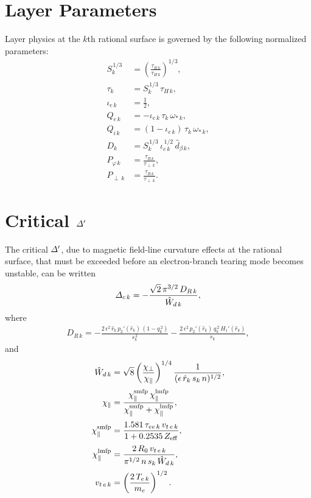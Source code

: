 \documentclass[12pt,prb,aps,notitlepage]{revtex4-1}
\begin{document}
\section{Layer Parameters}
Layer physics at the $k$th rational surface is governed by the following normalized parameters:
\begin{align}
S_k^{\,1/3} &= \left(\frac{\tau_{R\,k}}{\tau_{H\,k}}\right)^{1/3},\\[0.5ex]
\tau_k &= S_k^{\,1/3} \,\tau_{H\,k},\\[0.5ex]
\iota_{e\,k } &= \frac{1}{2},\\[0.5ex]
Q_{e\,k }&= - \iota_{e\,k}\,\tau_k\,\omega_{\ast\,k},\\[0.5ex]
Q_{i\,k }&=  (1-\iota_{e\,k})\,\tau_k\,\omega_{\ast\,k},\\[0.5ex]
D_k &= S_{k}^{\,1/3}\,\iota_{e\,k}^{\,1/2}\,\hat{d}_{\beta\,k},\\[0.5ex]
P_{\varphi\,k} &= \frac{\tau_{R\,k}}{\tau_{\perp\,k}},\\[0.5ex]
P_{\perp\,k} &= \frac{\tau_{R\,k}}{\tau_{\perp\,k}}.
\end{align}

\section{Critical ${\mit\Delta}'$}
The critical ${\mit\Delta}'$, due to magnetic field-line curvature effects at the rational surface, that must be exceeded before an
electron-branch tearing mode becomes unstable, can be written
\begin{align}
{\mit\Delta}_{c\,k} = - \frac{\sqrt{2}\,\pi^{3/2}\,D_{R\,k}}{\hat{W}_{d\,k}},
\end{align}
where
\begin{align}
D_{R\,k} = 
-\frac{2\,\epsilon^2\,\hat{r}_k\,p_2'(\hat{r}_k)\,(1-q_k^{\,2})}{s_k^{\,2}}
- \frac{2\,\epsilon^2\,p_2'(\hat{r}_k)\,q_k^{\,2}\,H_1'(\hat{r}_k)}{s_k},
\end{align}
and
\begin{align}
\hat{W}_{d\,k} &= \sqrt{8}\left(\frac{\chi_\perp}{\chi_\parallel}\right)^{1/4}
\frac{1}{(\epsilon\,\hat{r}_k\,s_k\,n)^{1/2}},\\[0.5ex]
\chi_\parallel &= \frac{\chi_\parallel^{\rm smfp} \,\chi_\parallel^{\rm lmfp}}{\chi_\parallel^{\rm smfp}+\chi_\parallel^{\rm lmfp}},\\[0.5ex]
\chi_\parallel^{\rm smfp} &= \frac{1.581\,\tau_{ee\,k}\,v_{t\,e\,k}}{1+ 0.2535\,Z_{\rm eff}},\\[0.5ex]
\chi_\parallel^{\rm lmfp}&= \frac{2\,R_0\,v_{t\,e\,k}}{\pi^{1/2}\,n\,s_k\,\hat{W}_{d\,k}},\\[0.5ex]
v_{t\,e\,k} &= \left(\frac{2\,T_{e\,k}}{m_e}\right)^{1/2}.
\end{align}
\end{document}
